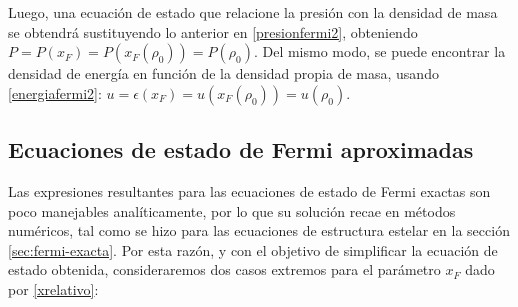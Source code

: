 Luego, una ecuación de estado que relacione la presión con la densidad de masa se obtendrá sustituyendo lo anterior en \eqref{presionfermi2}, obteniendo $P=P(x_F)=P(x_F(\rho_0))=P(\rho_0)$. Del mismo modo, se puede encontrar la densidad de energía en función de la densidad propia de masa, usando \eqref{energiafermi2}: $u=\epsilon(x_F)=u(x_F(\rho_0))=u(\rho_0)$.

\subsection{Ecuaciones de estado de Fermi aproximadas}
Las expresiones resultantes para las ecuaciones de estado de Fermi exactas son poco manejables analíticamente, por lo que su solución recae en métodos numéricos, tal como se hizo para las ecuaciones de estructura estelar en la sección \ref{sec:fermi-exacta}. Por esta razón, y con el objetivo de simplificar la ecuación de estado obtenida, consideraremos dos casos extremos para el parámetro $x_F$ dado por \eqref{xrelativo}:

